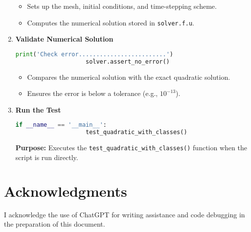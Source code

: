 \documentclass{article}
\begin{document}
\begin{enumerate}
				\begin{itemize}
					\item Sets up the mesh, initial conditions, and time-stepping scheme.
					\item Computes the numerical solution stored in \texttt{solver.f.u}.
				\end{itemize}
				
				\item \textbf{Validate Numerical Solution}
				\begin{lstlisting}[language=Python]
					print('Check error.........................')
					solver.assert_no_error()
				\end{lstlisting}
				
				\begin{itemize}
					\item Compares the numerical solution with the exact quadratic solution.
					\item Ensures the error is below a tolerance (e.g., \(10^{-13}\)).
				\end{itemize}
				
				\item \textbf{Run the Test}
				\begin{lstlisting}[language=Python]
				if __name__ == '__main__':
					test_quadratic_with_classes()
				\end{lstlisting}
				\textbf{Purpose:} Executes the \texttt{test\_quadratic\_with\_classes()} function when the script is run directly.
			\end{enumerate}
		
		
	
	
	\newpage
	\section*{Acknowledgments}
	
	I acknowledge the use of ChatGPT for writing assistance and code debugging in the preparation of this document.
\end{document}
